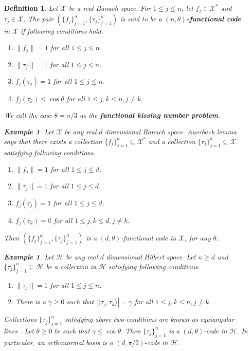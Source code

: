 \documentclass{amsart}
\newtheorem{definition}[theorem]{Definition}
\newtheorem{example}[theorem]{Example}
\begin{document}
 \begin{definition}\label{BK}
	Let $\mathcal{X}$ be a real Banach space. 	 For $1\leq j \leq n$, let $f_j\in \mathcal{X}^*$ and $\tau_j \in \mathcal{X}$. The pair $ (\{f_j \}_{j=1}^n, \{\tau_j \}_{j=1}^n) $ is said to be a  \textbf{$(n,\theta)$-functional code} in $ \mathcal{X}$
	if following conditions hold.
	\begin{enumerate}[\upshape(i)]
		\item $\|f_j\|=1$ for all $1\leq j \leq n$.
		\item $\|\tau_j\|= 1$ for all $1\leq j \leq n$.
		\item 	$f_j(\tau_j)= 1$ for all $1\leq j \leq n$.
		\item $f_j(\tau_k)\leq \cos \theta $ for all $1\leq j,k \leq n, j \neq k$.
	\end{enumerate}
We call the case $\theta=\pi/3$  as the \textbf{functional kissing number problem}.
\begin{example}
		Let $\mathcal{X}$ be any  real $d$ dimensional Banach space. Auerbach lemma \cite{WOJTASZCZYK} says that there exists a collection $ \{f_j \}_{j=1}^d\subseteq \mathcal{X}^*$ and a collection $ \{\tau_j \}_{j=1}^d \subseteq \mathcal{X}$ satisfying following conditions.
			\begin{enumerate}[\upshape(i)]
			\item $\|f_j\|=1$ for all $1\leq j \leq d$.
			\item $\|\tau_j\|= 1$ for all $1\leq j \leq d$.
			\item 	$f_j(\tau_j)= 1$ for all $1\leq j \leq d$.
			\item $f_j(\tau_k)=0 $ for all $1\leq j,k \leq d, j \neq k$.
		\end{enumerate}
	Then  $ (\{f_j \}_{j=1}^d, \{\tau_j \}_{j=1}^d) $ is a $(d,\theta)$-functional code in $ \mathcal{X}$, for any $\theta$. 
\end{example}
\begin{example}
	Let $\mathcal{H}$ be any  real $d$ dimensional Hilbert space. Let $n\geq d$ and  $ \{\tau_j \}_{j=1}^n \subseteq \mathcal{H}$ be a collection  in  $\mathcal{H}$  satisfying following conditions.
	\begin{enumerate}[\upshape(i)]
		\item $\|\tau_j\|= 1$ for all $1\leq j \leq n$.
		\item There is a $\gamma\geq 0$ such that $|\langle \tau_j, \tau_k\rangle|=\gamma $ for all $1\leq j,k \leq n, j \neq k$.
	\end{enumerate}
Collections $ \{\tau_j \}_{j=1}^n $ satisfying above two conditions are known as equiangular lines \cite{WALDRON}. Let  $\theta\geq 0$ be such that $\gamma \leq \cos \theta$. Then $\{\tau_j \}_{j=1}^n$  is a $(d,\theta)$-code in $ \mathcal{H}$. In particular, an orthonormal basis is a $(d,\pi/2)$-code in $ \mathcal{H}$.

\end{example}
\end{definition}
\end{document}
